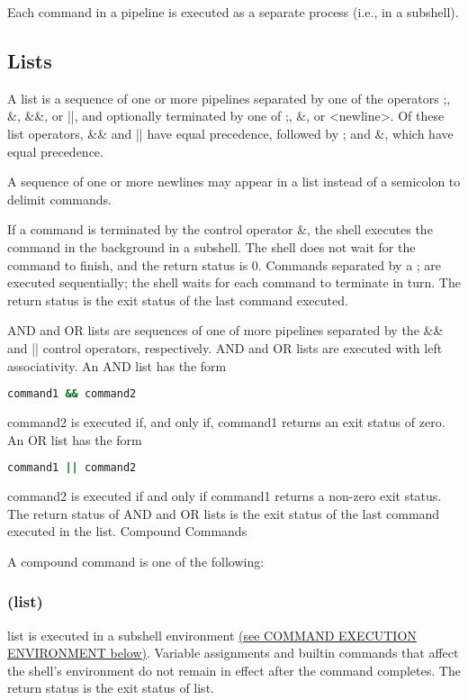 Each command in a pipeline is executed as a separate process (i.e., in a subshell).

\subsection{Lists}

A list is a sequence of one or more pipelines separated by one of the operators ;, \&, \&\&, or ||, and optionally terminated by one of ;, \&, or <newline>.
Of these list operators, \&\& and || have equal precedence, followed by ; and \&, which have equal precedence.

A sequence of one or more newlines may appear in a list instead of a semicolon to delimit commands.

If a command is terminated by the control operator \&, the shell executes the command in the background in a subshell. The shell does not wait for the command to finish, and the return status is 0. Commands separated by a ; are executed sequentially; the shell waits for each command to terminate in turn. The return status is the exit status of the last command executed.

AND and OR lists are sequences of one of more pipelines separated by the \&\& and || control operators, respectively. AND and OR lists are executed with left associativity. An AND list has the form

\begin{lstlisting}[language=bash]
  command1 && command2
\end{lstlisting}
command2 is executed if, and only if, command1 returns an exit status of zero.
An OR list has the form

\begin{lstlisting}[language=bash]
  command1 || command2
\end{lstlisting}
command2 is executed if and only if command1 returns a non-zero exit status. The return status of AND and OR lists is the exit status of the last command executed in the list.
Compound Commands

A compound command is one of the following:
\subsubsection*{(list)}
list is executed in a subshell environment \hyperref[sec:commandexecutionenvironment]{(see COMMAND EXECUTION ENVIRONMENT below)}. Variable assignments and builtin commands that affect the shell's environment do not remain in effect after the command completes. The return status is the exit status of list.


